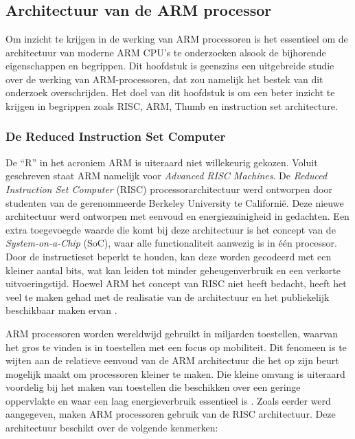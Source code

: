 \chapter{}
\label{ch:stand-van-zaken}



\section{Architectuur van de ARM processor}
Om inzicht te krijgen in de werking van ARM processoren is het essentieel om de architectuur van moderne ARM CPU’s te onderzoeken alsook de bijhorende eigenschappen en begrippen. Dit hoofdstuk is geenszins een uitgebreide studie over de werking van ARM-processoren, dat zou namelijk het bestek van dit onderzoek overschrijden. Het doel van dit hoofdstuk is om een beter inzicht te krijgen in begrippen zoals RISC, ARM, Thumb en instruction set architecture. 

\subsection{De Reduced Instruction Set Computer}
De “R” in het acroniem ARM is uiteraard niet willekeurig gekozen. Voluit geschreven staat ARM namelijk voor \textit{Advanced RISC Machines}. De \textit{Reduced Instruction Set Computer} (RISC) processorarchitectuur werd ontworpen door studenten van de gerenommeerde Berkeley University te Californië. Deze nieuwe architectuur werd ontworpen met eenvoud en energiezuinigheid in gedachten. Een extra toegevoegde waarde die komt bij deze architectuur is het concept van de \textit{System-on-a-Chip} (SoC), waar alle functionaliteit aanwezig is in één processor. Door de instructieset beperkt te houden, kan deze worden gecodeerd met een kleiner aantal bits, wat kan leiden tot minder geheugenverbruik en een verkorte uitvoeringstijd. Hoewel ARM het concept van RISC niet heeft bedacht, heeft het veel te maken gehad met de realisatie van de architectuur en het publiekelijk beschikbaar maken ervan \autocite{Fulton2020}. 

ARM processoren worden wereldwijd gebruikt in miljarden toestellen, waarvan het gros te vinden is in toestellen met een focus op mobiliteit. Dit fenomeen is te wijten aan de relatieve eenvoud van de ARM architectuur die het op zijn beurt mogelijk maakt om processoren kleiner te maken. Die kleine omvang is uiteraard voordelig bij het maken van toestellen die beschikken over een geringe oppervlakte en waar een laag energieverbruik essentieel is \autocite{Seal2000}. Zoals eerder werd aangegeven, maken ARM processoren gebruik van de RISC architectuur. Deze architectuur beschikt over de volgende kenmerken:

